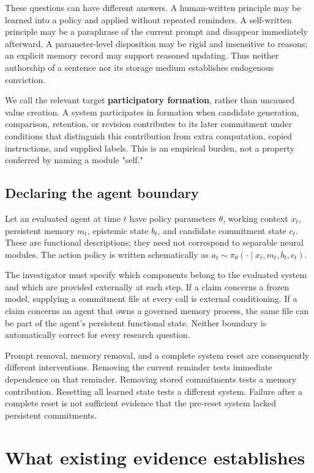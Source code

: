 \documentclass[11pt]{article}
\begin{document}
These questions can have different answers. A human-written principle may be learned into a policy and applied without repeated reminders. A self-written principle may be a paraphrase of the current prompt and disappear immediately afterward. A parameter-level disposition may be rigid and insensitive to reasons; an explicit memory record may support reasoned updating. Thus neither authorship of a sentence nor its storage medium establishes endogenous conviction.

We call the relevant target \textbf{participatory formation}, rather than uncaused value creation. A system participates in formation when candidate generation, comparison, retention, or revision contributes to its later commitment under conditions that distinguish this contribution from extra computation, copied instructions, and supplied labels. This is an empirical burden, not a property conferred by naming a module "self."

\subsection{Declaring the agent boundary}

Let an evaluated agent at time $t$ have policy parameters $\theta$, working context $x_t$, persistent memory $m_t$, epistemic state $b_t$, and candidate commitment state $c_t$. These are functional descriptions; they need not correspond to separable neural modules. The action policy is written schematically as $a_t \sim \pi_{\theta}(\cdot \mid x_t,m_t,b_t,c_t)$.

The investigator must specify which components belong to the evaluated system and which are provided externally at each step. If a claim concerns a frozen model, supplying a commitment file at every call is external conditioning. If a claim concerns an agent that owns a governed memory process, the same file can be part of the agent's persistent functional state. Neither boundary is automatically correct for every research question.

Prompt removal, memory removal, and a complete system reset are consequently different interventions. Removing the current reminder tests immediate dependence on that reminder. Removing stored commitments tests a memory contribution. Resetting all learned state tests a different system. Failure after a complete reset is not sufficient evidence that the pre-reset system lacked persistent commitments.

\section{What existing evidence establishes}
\end{document}
